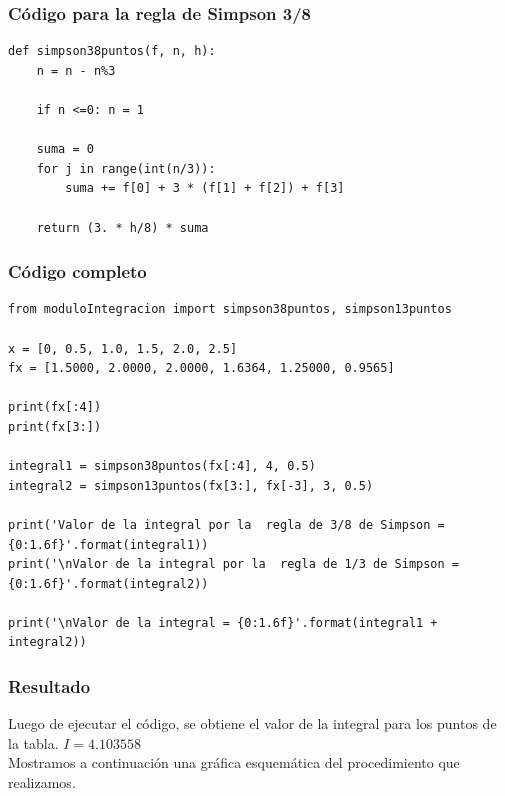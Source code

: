 \documentclass[12pt]{beamer}
\begin{document}
\begin{frame}
\frametitle{Código para la regla de Simpson 3/8}
\begin{lstlisting}[caption=Regla de Simpson de 3/8 para obtener la integral por pares de puntos]
def simpson38puntos(f, n, h):
	n = n - n%3

	if n <=0: n = 1

	suma = 0
	for j in range(int(n/3)):
		suma += f[0] + 3 * (f[1] + f[2]) + f[3]

	return (3. * h/8) * suma
\end{lstlisting}
\end{frame}
\begin{frame}
\frametitle{Código completo}
\begin{lstlisting}[caption=Código completo  para el ejercicio]
from moduloIntegracion import simpson38puntos, simpson13puntos

x = [0, 0.5, 1.0, 1.5, 2.0, 2.5]
fx = [1.5000, 2.0000, 2.0000, 1.6364, 1.25000, 0.9565]

print(fx[:4])
print(fx[3:])

integral1 = simpson38puntos(fx[:4], 4, 0.5)
integral2 = simpson13puntos(fx[3:], fx[-3], 3, 0.5)

print('Valor de la integral por la  regla de 3/8 de Simpson = {0:1.6f}'.format(integral1))
print('\nValor de la integral por la  regla de 1/3 de Simpson = {0:1.6f}'.format(integral2))

print('\nValor de la integral = {0:1.6f}'.format(integral1 + integral2))
\end{lstlisting}
\end{frame}
\begin{frame}
\frametitle{Resultado}
Luego de ejecutar el código, se obtiene el valor de la integral para los puntos de la tabla. \pause $ I = 4.103558$
\\
\bigskip
\pause
Mostramos a continuación una gráfica esquemática del procedimiento que realizamos.
\end{frame}
\end{document}
